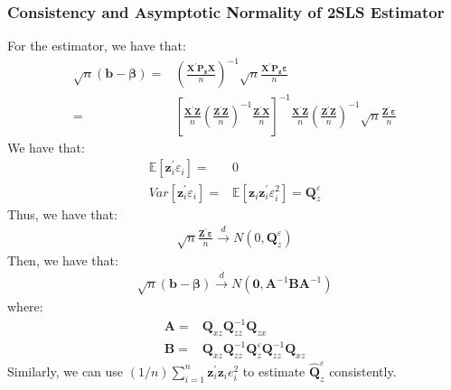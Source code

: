 \documentclass{article}
\begin{document}
\subsubsection{Consistency and Asymptotic Normality of 2SLS Estimator}
For the estimator, we have that:
	\begin{align*}
		\sqrt{n}(\boldsymbol{b} - \boldsymbol{\beta}) = & \left( \frac{\boldsymbol{X}^\prime \boldsymbol{P_z} \boldsymbol{X}}{n} \right)^{-1} \sqrt{n} \frac{\boldsymbol{X}^\prime \boldsymbol{P_z} \boldsymbol{\varepsilon}}{n}\\ = &
		\left[ \frac{\boldsymbol{X}^\prime \boldsymbol{Z}}{n} \left( \frac{\boldsymbol{Z}^\prime \boldsymbol{Z}}{n} \right)^{-1} \frac{\boldsymbol{Z}^\prime \boldsymbol{X}}{n} \right]^{-1} \frac{\boldsymbol{X}^\prime \boldsymbol{Z}}{n} \left( \frac{\boldsymbol{Z}^\prime \boldsymbol{Z}}{n} \right)^{-1} \sqrt{n} \frac{\boldsymbol{Z}^\prime \boldsymbol{\varepsilon}}{n}
	\end{align*}
We have that:
	\begin{align*}
		\mathbb{E} [\boldsymbol{z}^\prime_i \varepsilon_i] = &0\\
		Var[\boldsymbol{z}^\prime_i \varepsilon_i] = &\mathbb{E}[\boldsymbol{z}_i \boldsymbol{z}^\prime_i \varepsilon^2_i] = \boldsymbol{Q}^\varepsilon_z
	\end{align*}
Thus, we have that:
	\begin{align*}
		\sqrt{n} \frac{\boldsymbol{Z}^\prime \boldsymbol{\varepsilon}}{n} \xrightarrow{d} N(0, \boldsymbol{Q}^\varepsilon_z)
	\end{align*}
Then, we have that:
	\begin{align*}
		\sqrt{n}(\boldsymbol{b} - \boldsymbol{\beta}) \xrightarrow{d} N(\boldsymbol{0}, \boldsymbol{A}^{-1} \boldsymbol{B} \boldsymbol{A}^{-1})
	\end{align*}
where:
	\begin{align*}
		\boldsymbol{A} = &\boldsymbol{Q}_{xz} \boldsymbol{Q}^{-1}_{zz} \boldsymbol{Q}_{zx}\\
		\boldsymbol{B} = &\boldsymbol{Q}_{xz} \boldsymbol{Q}^{-1}_{zz} \boldsymbol{Q}^\varepsilon_z \boldsymbol{Q}^{-1}_{zz} \boldsymbol{Q}_{xz}
	\end{align*}
Similarly, we can use $(1/n)\sum^n_{i=1} \boldsymbol{z}^\prime_i \boldsymbol{z}_i e^2_i$ to estimate $\hat{\boldsymbol{Q}}^\varepsilon_z$ consistently.
\end{document}
